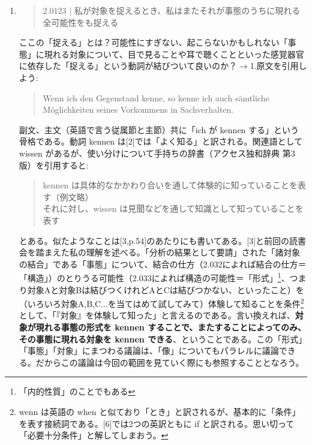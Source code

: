 \documentclass[11pt,a4paper]{jsbook}
\begin{document}
\begin{enumerate}
\item \label{kennen}
\begin{quote}2.0123 | 私が対象を捉えるとき、私はまたそれが事態のうちに現れる全可能性をも捉える
\end{quote}
ここの「捉える」とは？可能性にすぎない、起こらないかもしれない「事態」に現れる対象について、目で見ることや耳で聴くことといった感覚器官に依存した「捉える」という動詞が結びついて良いのか？$\rightarrow$1.原文を引用しよう:
\begin{quote}
Wenn ich den Gegenstand kenne, so kenne ich auch s\"amtliche M\"oglichkeiten seines Vorkommens in Sachverhalten.
\end{quote}
副文、主文（英語で言う従属節と主節）共に「ich が kennen する」という骨格である。動詞 kennen は[2]では「よく知る」と訳される。関連語として wissen があるが、使い分けについて手持ちの辞書（アクセス独和辞典 第3版）を引用すると:
\begin{quote}
kennen は具体的なかかわり合いを通して体験的に知っていることを表す（例文略） \\
それに対し、wissen は見聞などを通して知識として知っていることを表す
\end{quote}
とある。似たようなことは[3,p.54]のあたりにも書いてある。[3]と前回の読書会を踏まえた私の理解を述べる。「分析の結果として要請」された「諸対象の結合」である「事態」について、結合の仕方（2.032によれば結合の仕方＝「構造」）のとりうる可能性（2.033によれば構造の可能性＝「形式」\footnote{「内的性質」のことでもある}、つまり対象Aと対象Bは結びつくけれどAとCは結びつかない、といったこと）を（いろいろ対象A,B,C...を当てはめて試してみて）体験して知ることを条件\footnote{wenn は英語の when と似ており「とき」と訳されるが、基本的に「条件」を表す接続詞である。[6]では2つの英訳ともに if と訳される。思い切って「必要十分条件」と解してしまおう。}として、「『対象』を体験して知った」と言えるのである。言い換えれば、{\bf 対象が現れる事態の形式を kennen することで、またすることによってのみ、その事態に現れる対象を kennen できる}、ということである。この「形式」「事態」「対象」にまつわる議論は、「像」についてもパラレルに議論できる。だからこの議論は今回の範囲を見ていく際にも参照することとなろう。


\end{enumerate}
\end{document}
